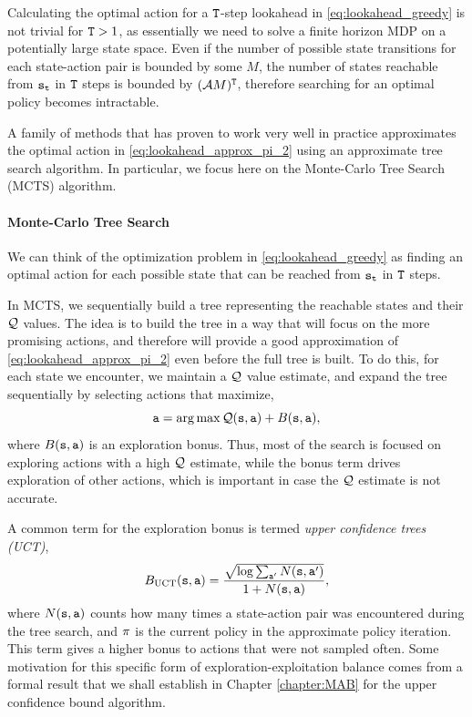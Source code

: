Calculating the optimal action for a ${\tt T}$-step lookahead in \eqref{eq:lookahead_greedy} is not trivial for ${\tt T} > 1$, as essentially we need to solve a finite horizon MDP on a potentially large state space. Even if the number of possible state transitions for each state-action pair is bounded by some $M$, the number of states reachable from ${\tt s}_{\tt t}$ in ${\tt T}$ steps is bounded by $(\mathcal{A} M)^{\tt T}$, therefore searching for an optimal policy becomes intractable. 

A family of methods that has proven to work very well in practice approximates the optimal action in \eqref{eq:lookahead_approx_pi_2} using an approximate tree search algorithm. In particular, we focus here on the Monte-Carlo Tree Search (MCTS) algorithm.

\paragraph{Monte-Carlo Tree Search}
We can think of the optimization problem in \eqref{eq:lookahead_greedy} as finding an optimal action for each possible state that can be reached from ${\tt s}_{\tt t}$ in ${\tt T}$ steps. 

In MCTS, we sequentially build a tree representing the reachable states and their $\mathcal{Q}$ values. The idea is to build the tree in a way that will focus on the more promising actions, and therefore will provide a good approximation of \eqref{eq:lookahead_approx_pi_2} even before the full tree is built. To do this, for each state we encounter, we maintain a $\mathcal{Q}$ value estimate, and expand the tree sequentially by selecting actions that maximize, 
\begin{equation*}
    \action = \argmax \QValue(\state, \action) + B(\state,\action),
\end{equation*}
where $B({\tt s},{\tt a})$ is an exploration bonus. Thus, most of the search is focused on exploring actions with a high $\mathcal{Q}$ estimate, while the bonus term drives exploration of other actions, which is important in case the $\mathcal{Q}$ estimate is not accurate.

A common term for the exploration bonus is termed \textit{upper confidence trees (UCT)},
\begin{equation*}
    B_{\textrm{UCT}}({\tt s},{\tt a}) = \frac{\sqrt{\log\sum_{{\tt a}'} N({\tt s},{\tt a}')}}{1+N({\tt s},{\tt a})},
\end{equation*}
where $N({\tt s},{\tt a})$ counts how many times a state-action pair was encountered during the tree search, and $\pi$ is the current policy in the approximate policy iteration. This term gives a higher bonus to actions that were not sampled often. Some motivation for this specific form of exploration-exploitation balance comes from a formal result that we shall establish in Chapter \ref{chapter:MAB} for the upper confidence bound algorithm. 

